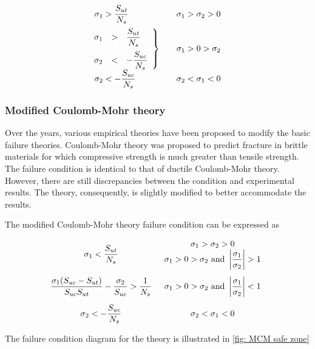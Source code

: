 \documentclass[a4paper,openany,nobib]{tufte-book}
\begin{document}
$$\begin{array}{l l l}
  \sigma_1 > \dfrac{S_{ut}}{N_s} & & \sigma_1 > \sigma_2 > 0 \\[10pt]
  \left. \hspace{-0.23cm}
  \begin{array}{l l l}
    \sigma_1 & > & \dfrac{S_{ut}}{N_s} \\[10pt]
    \sigma_2 & < & -\dfrac{S_{uc}}{N_s}
    \end{array} \right\} & & \sigma_1 > 0 > \sigma_2 \\[10pt]
    \sigma_2 <  - \dfrac{S_{uc}}{N_s} & & \sigma _2 < \sigma _1 < 0
  \end{array}$$

\subsubsection{Modified Coulomb-Mohr theory}
\label{modified-coulomb-mohr-theory}
Over the years, various empirical theories have been proposed to modify
the basic failure theories. Coulomb-Mohr theory was proposed to predict
fracture in brittle materials for which compressive strength is much
greater than tensile strength. The failure condition is identical to
that of ductile Coulomb-Mohr theory. However, there are still
discrepancies between the condition and experimental results. The
theory, consequently, is slightly modified to better accommodate the
results.

The modified Coulomb-Mohr theory failure condition can be expressed as

$$\begin{array}{c c}
    \sigma_1 < \dfrac{S_{ut}}{N_s} &
      \begin{array}{c}
        \sigma_1 > \sigma_2 > 0 \\ 
        \sigma_1 > 0 > \sigma_2 \text{ and } \left| \dfrac{\sigma_1}{\sigma_2} \right| > 1 
      \end{array} \\[20pt]
    \dfrac{\sigma_1(S_{uc} - S_{ut})}{S_{uc}S_{ut}} - \dfrac{\sigma_2}{S_{uc}} >
      \dfrac{1}{N_s} & \sigma_1 > 0 > \sigma_2\text{ and }\left| \dfrac{\sigma_1}{\sigma_2} \right| < 1 \\[15pt]
    \sigma_2 <  -\dfrac{S_{uc}}{N_s} & \sigma_2 < \sigma_1 < 0 
  \end{array}$$

The failure condition diagram for the theory is illustrated in
\ref{fig: MCM safe zone}
\end{document}
